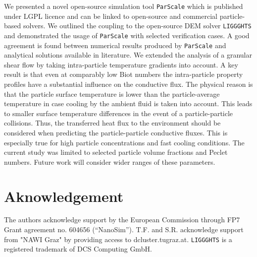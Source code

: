 \documentclass{particles2015}
\begin{document}
We presented a novel open-source simulation tool \texttt{ParScale} which is published under LGPL licence and can be linked to open-source and commercial particle-based solvers. We outlined the coupling to the open-source DEM solver \texttt{LIGGGHTS}\textsuperscript{\textregistered} and demonstrated the usage of \texttt{ParScale} with selected verification cases. A good agreement is found between numerical results produced by \texttt{ParScale} and analytical solutions available in literature. We extended the analysis of a granular shear flow by taking intra-particle temperature gradients into account. A key result is that even at comparably low Biot numbers the intra-particle property profiles have a substantial influence on the conductive flux. The physical reason is that the particle surface temperature is lower than the particle-average temperature in case cooling by the ambient fluid is taken into account. This leads to smaller surface temperature differences in the event of a particle-particle collisions. Thus, the transferred heat flux to the environment should be considered when predicting the particle-particle conductive fluxes. This is especially true for high particle concentrations and fast cooling conditions. The current study was limited to selected particle volume fractions and Peclet numbers. Future work will consider wider ranges of these parameters. 

\section{Aknowledgement}
The authors acknowledge support by the European Commission through FP7 Grant agreement no. 604656 (“NanoSim”). T.F. and S.R. acknowledge support from "NAWI Graz" by providing access to dcluster.tugraz.at. \texttt{LIGGGHTS}\textsuperscript{\textregistered} is a registered trademark of DCS Computing GmbH.

\newpage

\end{document}
